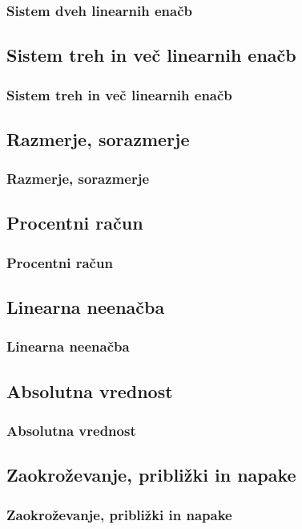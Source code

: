         \begin{frame}
            \frametitle{Sistem dveh linearnih enačb}
        \end{frame}

    \subsection{Sistem treh in več linearnih enačb}

        \begin{frame}
            \frametitle{Sistem treh in več linearnih enačb}
        \end{frame}

    \subsection{Razmerje, sorazmerje}

        \begin{frame}
            \frametitle{Razmerje, sorazmerje}
        \end{frame}

    \subsection{Procentni račun}

        \begin{frame}
            \frametitle{Procentni račun}
        \end{frame}

    \subsection{Linearna neenačba}

        \begin{frame}
            \frametitle{Linearna neenačba}
        \end{frame}

    \subsection{Absolutna vrednost}
        
        \begin{frame}
            \frametitle{Absolutna vrednost}
        \end{frame}

    \subsection{Zaokroževanje, približki in napake}

        \begin{frame}
            \frametitle{Zaokroževanje, približki in napake}
        \end{frame}
